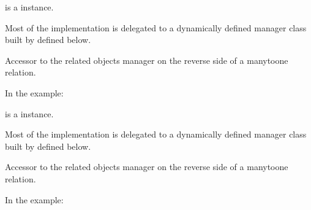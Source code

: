 \documentclass[letterpaper,10pt,english]{sphinxmanual}
\begin{document}
\begin{fulllineitems}
\begin{fulllineitems}
 is a  instance.

Most of the implementation is delegated to a dynamically defined manager
class built by  defined below.

\end{fulllineitems}


\begin{fulllineitems}
\label{\detokenize{accounts:accounts.models.User.primary_member}}
Accessor to the related objects manager on the reverse side of a
many\sphinxhyphen{}to\sphinxhyphen{}one relation.

In the example:

\begin{sphinxVerbatim}[commandchars=\\\{\}]
 
       
\end{sphinxVerbatim}

 is a  instance.

Most of the implementation is delegated to a dynamically defined manager
class built by  defined below.

\end{fulllineitems}


\begin{fulllineitems}
\label{\detokenize{accounts:accounts.models.User.rbacadmingroup_set}}
Accessor to the related objects manager on the reverse side of a
many\sphinxhyphen{}to\sphinxhyphen{}one relation.

In the example:


\end{fulllineitems}
\end{fulllineitems}
\end{document}
